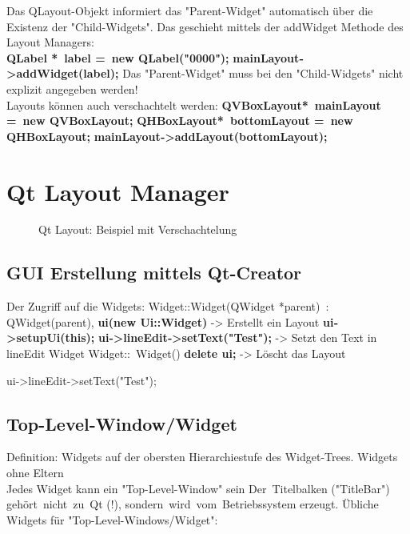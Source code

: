 Das QLayout-Objekt informiert das "Parent-Widget" automatisch über die Existenz der "Child-Widgets". Das geschieht mittels der addWidget Methode des Layout Managers: \\
\textbf{QLabel * label = new QLabel("0000");}
\textbf{mainLayout‐>addWidget(label);}
Das "Parent-Widget" muss bei den "Child-Widgets" nicht explizit angegeben werden! \\
Layouts können auch verschachtelt werden:
\textbf{QVBoxLayout* mainLayout = new QVBoxLayout;}
\textbf{QHBoxLayout* bottomLayout = new QHBoxLayout;}
\textbf{mainLayout‐>addLayout(bottomLayout);}

\section{Qt Layout Manager}
\begin{figure}[ht]
	\centering
	\caption[]{Qt Layout: Beispiel mit Verschachtelung}
\end{figure}

\subsection{GUI Erstellung mittels Qt-Creator}

Der Zugriff auf die Widgets:
Widget::Widget(QWidget *parent) :
QWidget(parent),
\textbf{ui(new Ui::Widget)} -> Erstellt ein Layout
{
\textbf{	ui‐>setupUi(this);}
\textbf{	ui‐>lineEdit‐>setText("Test");} -> Setzt den Text in lineEdit Widget
}
Widget::~Widget()
{
\textbf{delete ui;} -> Löscht das Layout
}

ui->lineEdit->setText("Test");

\subsection{Top-Level-Window/Widget}
Definition: Widgets auf der obersten Hierarchiestufe des Widget-Trees.  Widgets ohne Eltern \\
Jedes Widget kann ein "Top-Level-Window" sein
Der Titelbalken ("TitleBar") gehört nicht zu Qt (!), sondern wird vom Betriebssystem erzeugt.
Übliche Widgets für "Top-Level-Windows/Widget":

